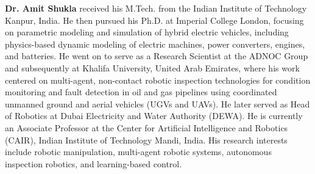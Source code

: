 \documentclass[a4paper,fleqn]{cas-dc}
\begin{document}
\bio{}
\textbf{Dr. Amit Shukla} received his M.Tech. from the Indian Institute of Technology Kanpur, India. He then pursued his Ph.D. at Imperial College London, focusing on parametric modeling and simulation of hybrid electric vehicles, including physics-based dynamic modeling of electric machines, power converters, engines, and batteries. He went on to serve as a Research Scientist at the ADNOC Group and subsequently at Khalifa University, United Arab Emirates, where his work centered on multi-agent, non-contact robotic inspection technologies for condition monitoring and fault detection in oil and gas pipelines using coordinated unmanned ground and aerial vehicles (UGVs and UAVs). He later served as Head of Robotics at Dubai Electricity and Water Authority (DEWA). He is currently an Associate Professor at the Center for Artificial Intelligence and Robotics (CAIR), Indian Institute of Technology Mandi, India. His research interests include robotic manipulation, multi-agent robotic systems, autonomous inspection robotics, and learning-based control.
\endbio


\end{document}
